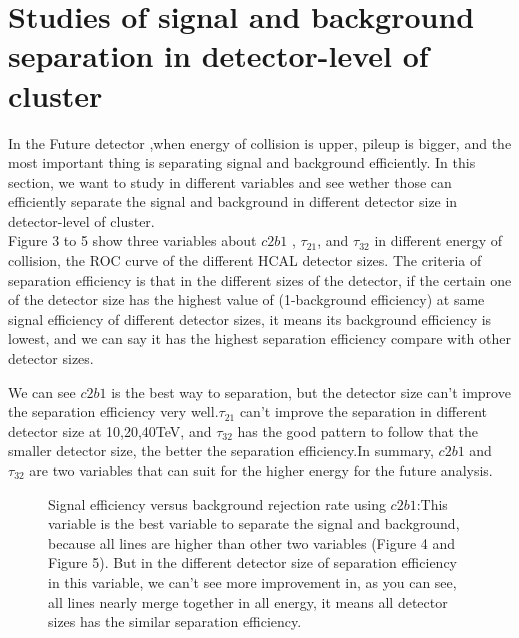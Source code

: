 \section{Studies of signal and background separation in detector-level of cluster}
In the Future detector ,when energy of collision is upper, pileup is bigger, and the most important thing is separating signal and background efficiently. In this section, we want to study in different variables and see wether those can efficiently separate the signal and background in different detector size in detector-level of cluster.\\

Figure 3 to 5 show three variables about $c2b1$ , $\tau_{21}$, and $\tau_{32}$ in different energy of collision, the ROC curve of the different HCAL detector sizes. The criteria of separation efficiency is that in the different sizes of the detector, if the certain one of the detector size has the highest value of (1-background efficiency) at same signal efficiency of different detector sizes, it means its background efficiency is lowest, and we can say it has the highest separation efficiency compare with other detector sizes.

We can see  $c2b1$ is the best way to separation, but the detector size can't improve the separation efficiency very well.$\tau_{21}$ can't improve the separation in different detector size at 10,20,40TeV, and $\tau_{32}$ has the good pattern to follow that the smaller detector size, the better the separation efficiency.In summary, $c2b1$ and $\tau_{32}$ are two variables that can suit for the higher energy for the future analysis.\\
\label{sec:efficiency}


\begin{figure}
\begin{center}
\end{center}
\caption{Signal efficiency versus background rejection rate using $c2b1$:This variable is the best variable to separate the signal and background, because all lines are higher than other two variables (Figure 4 and Figure 5). But in the different detector size of separation efficiency in this variable, we can't see more improvement in, as you can see, all lines nearly merge together in all energy, it means all detector sizes has the similar separation efficiency.}
\label{fig:cluster_c2b1}
\end{figure}


